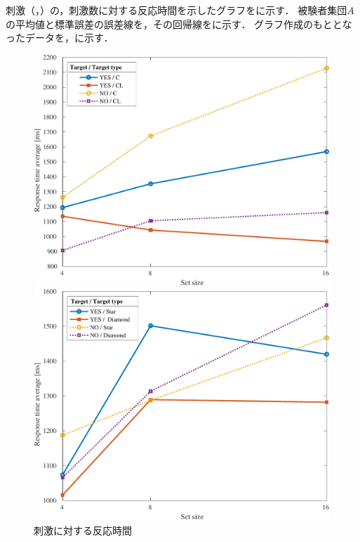 \section{\result}
刺激（，）の，刺激数に対する反応時間を示したグラフをに示す．
被験者集団\(A\)の平均値と標準誤差の誤差線を，その回帰線をに示す．
グラフ作成のもととなったデータを，に示す．
\begin{figure}[H]
    \centering
    \begin{minipage}[b]{.49\textwidth}
        \centering
        \includegraphics[keepaspectratio,width=\textwidth]{../../Figures/13_01_graph.pdf}
    \end{minipage}
    \begin{minipage}[b]{.49\textwidth}
        \centering
        \includegraphics[keepaspectratio,width=\textwidth]{../../Figures/13_02_graph.pdf}
    \end{minipage}
    \caption{刺激に対する反応時間}
    \label{fig:刺激対の刺激数に対する反応時間}
\end{figure}
